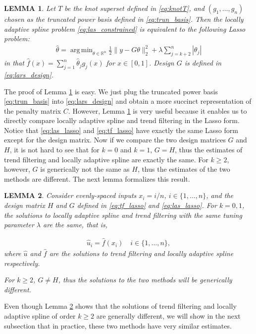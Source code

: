 \documentclass[a4paper]{article}
\DeclareMathOperator*{\argmin}{arg\,min}
\newtheorem{lemma}{LEMMA}
\newcommand{\RR}{\mathbb{R}}
\begin{document}
\begin{lemma}
Let $T$ be the knot superset defined in \eqref{eq:knotT}, and $(g_1,\ldots, g_n)$ chosen as the truncated power basis defined in \eqref{eq:trun_basis}. Then the locally adaptive spline problem \eqref{eq:las_constrained} is equivalent to the following Lasso problem:
\begin{align}
\hat{\theta} = \argmin_{\theta\in\RR^n}\frac{1}{2}\|y-G\theta\|_2^2 + \lambda\sum_{j=k+2}^n |\theta_j|
\label{eq:las_lasso}
\end{align}
in that $\hat{f}(x) = \sum_{j=1}^n \hat{\theta}_jg_j(x)$ for $x\in[0, 1]$. Design $G$ is defined in \eqref{eq:lars_design}.
\label{lemma:las_lasso}
\end{lemma}

The proof of Lemma \ref{lemma:las_lasso} is easy. We just plug the truncated power basis \eqref{eq:trun_basis} into \eqref{eq:lars_design} and obtain a more succinct representation of the penalty matrix $C$. However, Lemma \ref{lemma:las_lasso} is very useful because it enables us to directly compare locally adaptive spline and trend filtering in the Lasso form. Notice that \eqref{eq:las_lasso} and \eqref{eq:tf_lasso} have exactly the same Lasso form except for the design matrix. Now if we compare the two design matrices $G$ and $H$, it is not hard to see that for $k = 0$ and $k = 1$, $G = H$, thus the estimates of trend filtering and locally adaptive spline are exactly the same. For $k\geq 2$, however, $G$ is generically not the same as $H$, thus the estimates of the two methods are different. The next lemma formalizes this result. 

\begin{lemma}
Consider evenly-spaced inputs $x_i = i/n$, $i\in\{1,\ldots, n\}$, and the design matrix $H$ and $G$ defined in \eqref{eq:tf_lasso} and \eqref{eq:las_lasso}. For $k = 0, 1$, the solutions to locally adaptive spline and trend filtering with the same tuning parameter $\lambda$ are the same, that is,

\begin{align*}
\hat{u}_i = \hat{f}(x_i) \quad i\in\{1,\ldots, n\},
\end{align*}
where $\hat{u}$ and $\hat{f}$ are the solutions to trend filtering and locally adaptive spline respectively.

For $k\geq 2$, $G\neq H$, thus the solutions to the two methods will be generically different. 
\label{lemma:lasequivtf}
\end{lemma}

Even though Lemma \ref{lemma:lasequivtf} shows that the solutions of trend filtering and locally adaptive spline of order $k\geq 2$ are generally different, we will show in the next subsection that in practice, these two methods have very similar estimates. 
\end{document}
